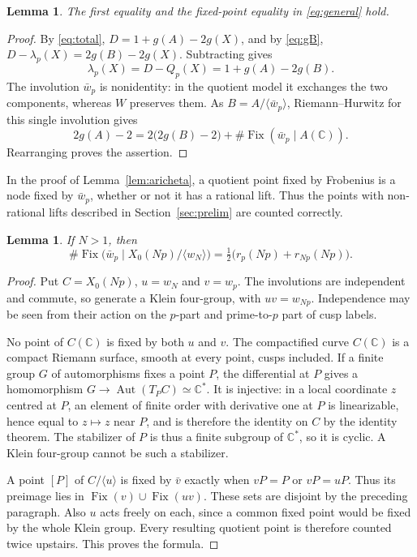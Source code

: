 \documentclass[11pt,a4paper]{article}
\newtheorem{lemma}[theorem]{Lemma}
\theoremstyle{remark}\newtheorem{remark}[theorem]{Remark}
\numberwithin{equation}{section}
\newcommand{\C}{\mathbb C}\newcommand{\Fp}{\mathbb F_p}
\newcommand{\Fix}{\operatorname{Fix}}
\begin{document}
	\begin{lemma}\label{lem:single}
		The first equality and the fixed-point equality in \eqref{eq:general} hold.
	\end{lemma}
	\begin{proof}
		By \eqref{eq:total}, $D=1+g(A)-2g(X)$, and by \eqref{eq:gB}, $D-\lambda_p(X)=2g(B)-2g(X)$. Subtracting gives
		\[
		\lambda_p(X)=D-Q_p(X)=1+g(A)-2g(B).
		\]
		The involution $\bar w_p$ is nonidentity: in the quotient model it exchanges the two components, whereas $W$ preserves them. As $B=A/\langle\bar w_p\rangle$, Riemann--Hurwitz for this single involution gives
		\[
		2g(A)-2=2\bigl(2g(B)-2\bigr)
		+\#\Fix(\bar w_p\mid A(\C)).
		\]
		Rearranging proves the assertion.
	\end{proof}
	
	In the proof of Lemma~\ref{lem:aricheta}, a quotient point fixed by Frobenius is a node fixed by $\bar w_p$, whether or not it has a rational lift. Thus the points with non-rational lifts described in Section~\ref{sec:prelim} are counted correctly.
	
	\begin{lemma}\label{lem:lift}
		If $N>1$, then
		\[
		\#\Fix\bigl(\bar w_p\mid X_0(Np)/\langle w_N\rangle\bigr)
		=\tfrac12\bigl(r_p(Np)+r_{Np}(Np)\bigr).
		\]
	\end{lemma}
	\begin{proof}
		Put $C=X_0(Np)$, $u=w_N$ and $v=w_p$. The involutions are independent and commute, so generate a Klein four-group, with $uv=w_{Np}$. Independence may be seen from their action on the $p$-part and prime-to-$p$ part of cusp labels.
		
		No point of $C(\C)$ is fixed by both $u$ and $v$. The compactified curve $C(\C)$ is a compact Riemann surface, smooth at every point, cusps included. If a finite group $G$ of automorphisms fixes a point $P$, the differential at $P$ gives a homomorphism $G\to\operatorname{Aut}(T_PC)\simeq\C^*$. It is injective: in a local coordinate $z$ centred at $P$, an element of finite order with derivative one at $P$ is linearizable, hence equal to $z\mapsto z$ near $P$, and is therefore the identity on $C$ by the identity theorem. The stabilizer of $P$ is thus a finite subgroup of $\C^*$, so it is cyclic. A Klein four-group cannot be such a stabilizer.
		
		A point $[P]$ of $C/\langle u\rangle$ is fixed by $\bar v$ exactly when $vP=P$ or $vP=uP$. Thus its preimage lies in $\Fix(v)\cup\Fix(uv)$. These sets are disjoint by the preceding paragraph. Also $u$ acts freely on each, since a common fixed point would be fixed by the whole Klein group. Every resulting quotient point is therefore counted twice upstairs. This proves the formula.
	\end{proof}
	
\end{document}
